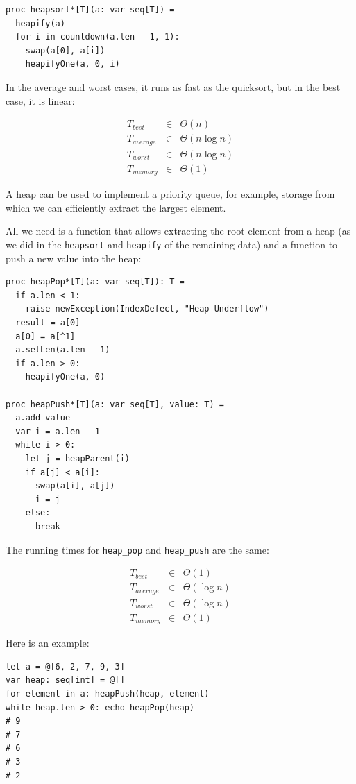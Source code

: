 \documentclass[justified, sixbynine]{tufte-book}
\def\ft{\small\tt}
\theoremstyle{plain}%
\newtheorem * {corollary}{Corollary}
\theoremstyle{definition}
\theoremstyle{remark}
\newtheorem * {remark}{Remark}
\newtheorem * {note}{Note}
\begin{document}
\begin{fullwidth}
\begin{lstlisting}
proc heapsort*[T](a: var seq[T]) =
  heapify(a)
  for i in countdown(a.len - 1, 1):
    swap(a[0], a[i])
    heapifyOne(a, 0, i)
\end{lstlisting}

In the average and worst cases, it runs as fast as the quicksort, but in the best case, it is linear:

\begin{eqnarray}
T_{best} &\in &\Theta (n) \\
T_{average} &\in &\Theta (n\log n) \\
T_{worst} &\in &\Theta (n\log n) \\
T_{memory} &\in &\Theta (1)
\end{eqnarray}


A heap can be used to implement a priority queue, for example, storage from which we can efficiently extract the largest element.

All we need is a function that allows extracting the root element from a heap (as we did in the {\ft heapsort} and {\ft heapify} of the remaining data) and a function to push a new value into the heap:

\begin{lstlisting}
proc heapPop*[T](a: var seq[T]): T =
  if a.len < 1:
    raise newException(IndexDefect, "Heap Underflow")
  result = a[0]
  a[0] = a[^1]
  a.setLen(a.len - 1)
  if a.len > 0:
    heapifyOne(a, 0)

proc heapPush*[T](a: var seq[T], value: T) =
  a.add value
  var i = a.len - 1
  while i > 0:
    let j = heapParent(i)
    if a[j] < a[i]:
      swap(a[i], a[j])
      i = j
    else:
      break
\end{lstlisting}

The running times for {\ft heap\_pop} and {\ft heap\_push} are the same:

\begin{eqnarray}
T_{best} &\in &\Theta (1) \\
T_{average} &\in &\Theta (\log n) \\
T_{worst} &\in &\Theta (\log n) \\
T_{memory} &\in &\Theta (1)
\end{eqnarray}

Here is an example:

\begin{lstlisting}
let a = @[6, 2, 7, 9, 3]
var heap: seq[int] = @[]
for element in a: heapPush(heap, element)
while heap.len > 0: echo heapPop(heap)
# 9
# 7
# 6
# 3
# 2
\end{lstlisting}


\end{fullwidth}
\end{document}
